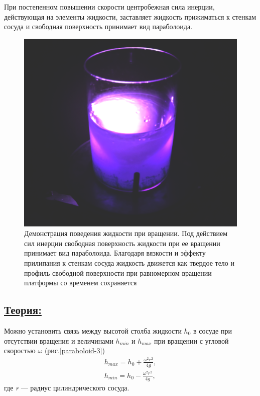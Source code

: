 \documentclass[14pt,a4paper,oneside]{extarticle}	%
\begin{document}
При постепенном повышении скорости центробежная сила инерции, действующая на элементы жидкости, заставляет жидкость прижиматься к стенкам сосуда и свободная поверхность принимает вид параболоида. 

\begin{figure}[H] 	
	\centering 	
	\includegraphics[width=0.6\linewidth]{paraboloid-2.png}
	\caption{Демонстрация поведения жидкости при вращении. Под действием сил инерции свободная поверхность жидкости при ее вращении принимает вид параболоида. Благодаря вязкости и эффекту прилипания к стенкам сосуда жидкость движется как твердое тело и профиль свободной поверхности при равномерном вращении платформы со временем сохраняется}
	\label{paraboloid-2}
\end{figure}

\newpage
\subsection*{\underline{Теория:}}

Можно установить связь между высотой столба жидкости $ h_{0} $ в сосуде при отсутствии вращения и величинами $ h_{min} $ и $ h_{max} $ при вращении с угловой скоростью $ \omega $ (рис.\ref{paraboloid-3})
\begin{align}\label{1}
h_{max} = h_{0} + \frac{\omega^{2} r^{2}}{4g}, \\
h_{min} = h_{0} - \frac{\omega^{2} r^{2}}{4g},
\end{align}
где \textit{r} — радиус цилиндрического сосуда.
\end{document}
